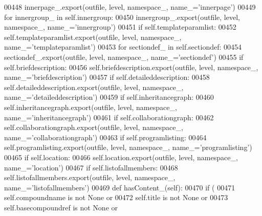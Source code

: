 \begin{DoxyCode}
{{{{{{{{{{{{{{{{{{{{{{{{{{{{{{{00448             innerpage\_.export(outfile, level, namespace\_, name\_=\textcolor{stringliteral}{'innerpage'})
00449         \textcolor{keywordflow}{for} innergroup\_ \textcolor{keywordflow}{in} self.innergroup:
00450             innergroup\_.export(outfile, level, namespace\_, name\_=\textcolor{stringliteral}{'innergroup'})
00451         \textcolor{keywordflow}{if} self.templateparamlist:
00452             self.templateparamlist.export(outfile, level, namespace\_, name\_=\textcolor{stringliteral}{'templateparamlist'})
00453         \textcolor{keywordflow}{for} sectiondef\_ \textcolor{keywordflow}{in} self.sectiondef:
00454             sectiondef\_.export(outfile, level, namespace\_, name\_=\textcolor{stringliteral}{'sectiondef'})
00455         \textcolor{keywordflow}{if} self.briefdescription:
00456             self.briefdescription.export(outfile, level, namespace\_, name\_=\textcolor{stringliteral}{'briefdescription'})
00457         \textcolor{keywordflow}{if} self.detaileddescription:
00458             self.detaileddescription.export(outfile, level, namespace\_, name\_=\textcolor{stringliteral}{'detaileddescription'})
00459         \textcolor{keywordflow}{if} self.inheritancegraph:
00460             self.inheritancegraph.export(outfile, level, namespace\_, name\_=\textcolor{stringliteral}{'inheritancegraph'})
00461         \textcolor{keywordflow}{if} self.collaborationgraph:
00462             self.collaborationgraph.export(outfile, level, namespace\_, name\_=\textcolor{stringliteral}{'collaborationgraph'})
00463         \textcolor{keywordflow}{if} self.programlisting:
00464             self.programlisting.export(outfile, level, namespace\_, name\_=\textcolor{stringliteral}{'programlisting'})
00465         \textcolor{keywordflow}{if} self.location:
00466             self.location.export(outfile, level, namespace\_, name\_=\textcolor{stringliteral}{'location'})
00467         \textcolor{keywordflow}{if} self.listofallmembers:
00468             self.listofallmembers.export(outfile, level, namespace\_, name\_=\textcolor{stringliteral}{'listofallmembers'})
00469     \textcolor{keyword}{def }hasContent_(self):
00470         \textcolor{keywordflow}{if} (
00471             self.compoundname \textcolor{keywordflow}{is} \textcolor{keywordflow}{not} \textcolor{keywordtype}{None} \textcolor{keywordflow}{or}
00472             self.title \textcolor{keywordflow}{is} \textcolor{keywordflow}{not} \textcolor{keywordtype}{None} \textcolor{keywordflow}{or}
00473             self.basecompoundref \textcolor{keywordflow}{is} \textcolor{keywordflow}{not} \textcolor{keywordtype}{None} \textcolor{keywordflow}{or}
}}}}}}}}}}}}}}}}}}}}}}}}}}}}}}}
\end{DoxyCode}
